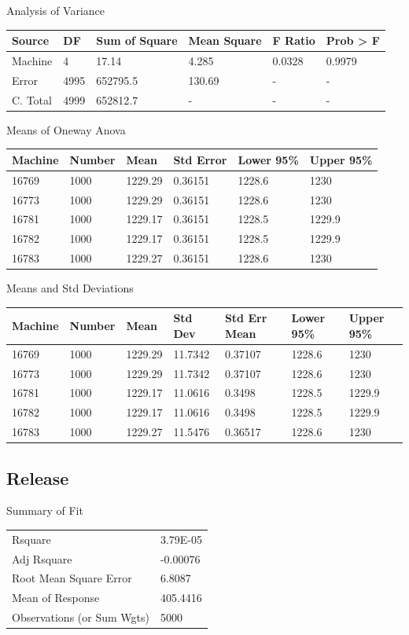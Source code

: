 \documentclass[12pt,twocolumn]{report}
\begin{document}
Analysis of Variance
\newline
\begin{tabular}{l | l | l | l | l | l}
Source&DF&Sum of Square&Mean Square&F Ratio&Prob > F \\
\hline
Machine&4&17.14&4.285&0.0328&0.9979 \\
Error&4995&652795.5&130.69&-&- \\
C. Total&4999&652812.7&-&-&- \\
\end{tabular}
\newline

Means of Oneway Anova
\newline
\begin{tabular}{l | l | l | l | l | l}
Machine&Number&Mean&Std Error&Lower 95\%&Upper 95\% \\
\hline
16769&1000&1229.29&0.36151&1228.6&1230 \\
16773&1000&1229.29&0.36151&1228.6&1230 \\
16781&1000&1229.17&0.36151&1228.5&1229.9 \\
16782&1000&1229.17&0.36151&1228.5&1229.9 \\
16783&1000&1229.27&0.36151&1228.6&1230 \\
\end{tabular}
\newline

Means and Std Deviations
\newline
\begin{tabular}{l | l | l | l | l | l | l}
Machine&Number&Mean&Std Dev&Std Err Mean&Lower 95\%&Upper 95\% \\
\hline
16769&1000&1229.29&11.7342&0.37107&1228.6&1230 \\
16773&1000&1229.29&11.7342&0.37107&1228.6&1230 \\
16781&1000&1229.17&11.0616&0.3498&1228.5&1229.9 \\
16782&1000&1229.17&11.0616&0.3498&1228.5&1229.9 \\
16783&1000&1229.27&11.5476&0.36517&1228.6&1230 \\
\end{tabular}
\newline

\subsection{Release}
Summary of Fit
\newline
\begin{tabular}{l | l}
  Rsquare&3.79E-05 \\
  Adj Rsquare&-0.00076 \\
  Root Mean Square Error&6.8087 \\
  Mean of Response&405.4416 \\
  Observations (or Sum Wgts)&5000 \\
\end{tabular}
\newline
  \newline
\end{document}
